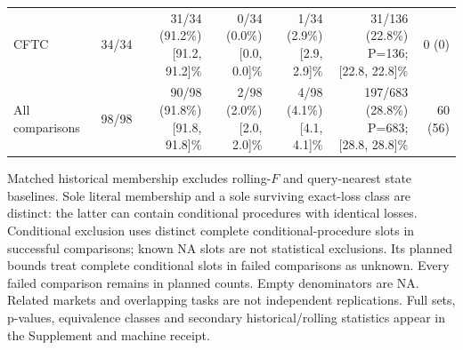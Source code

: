 \begin{table}[t]
{\begin{tabular}{lrrrrrr}
CFTC & 34/34 & \shortstack{31/34 (91.2\%)\\{}[91.2, 91.2]\%} & \shortstack{0/34 (0.0\%)\\{}[0.0, 0.0]\%} & \shortstack{1/34 (2.9\%)\\{}[2.9, 2.9]\%} & \shortstack{31/136 (22.8\%)\\P=136; [22.8, 22.8]\%} & 0 (0) \\
All comparisons & 98/98 & \shortstack{90/98 (91.8\%)\\{}[91.8, 91.8]\%} & \shortstack{2/98 (2.0\%)\\{}[2.0, 2.0]\%} & \shortstack{4/98 (4.1\%)\\{}[4.1, 4.1]\%} & \shortstack{197/683 (28.8\%)\\P=683; [28.8, 28.8]\%} & 60 (56) \\
\bottomrule
\end{tabular}}
\par\vspace{2pt}
\begin{minipage}{0.98\linewidth}\footnotesize
Matched historical membership excludes rolling-$F$ and query-nearest state baselines. Sole literal membership and a sole surviving exact-loss class are distinct: the latter can contain conditional procedures with identical losses. Conditional exclusion uses distinct complete conditional-procedure slots in successful comparisons; known NA slots are not statistical exclusions. Its planned bounds treat complete conditional slots in failed comparisons as unknown. Every failed comparison remains in planned counts. Empty denominators are NA. Related markets and overlapping tasks are not independent replications. Full sets, p-values, equivalence classes and secondary historical/rolling statistics appear in the Supplement and machine receipt.
\end{minipage}
\end{table}
